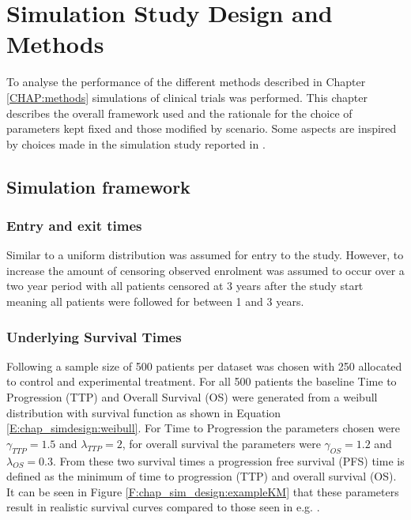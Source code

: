 \chapter{Simulation Study Design and Methods}
\label{C:chap_sim_design}


To analyse the performance of the different methods described in Chapter \ref{CHAP:methods} simulations of clinical trials was performed. This chapter describes the overall framework used and the rationale for the choice of parameters kept fixed and those modified by scenario. Some aspects are inspired by choices made in the simulation study reported in \cite{Morden2011}.

\section{Simulation framework}

\label{section:studydesign}

\subsection{Entry and exit times}
Similar to \cite{Morden2011} a uniform distribution was assumed for entry to the study. However, to increase the amount of censoring observed enrolment was assumed to occur over a two year period with all patients censored at 3 years after the study start meaning all patients were followed for between 1 and 3 years.

\subsection{Underlying Survival Times}
Following \cite{Morden2011} a sample size of 500 patients per dataset was chosen with 250 allocated to control and experimental treatment. For all 500 patients the baseline Time to Progression (TTP) and Overall Survival (OS) were generated from a weibull distribution with survival function as shown in Equation \ref{E:chap_simdesign:weibull}. For Time to Progression the parameters chosen were $\gamma_{TTP}=1.5$ and $\lambda_{TTP}=2$, for overall survival the parameters were $\gamma_{OS}=1.2$ and $\lambda_{OS}=0.3$. From these two survival times a progression free survival (PFS) time is defined as the minimum of time to progression (TTP) and overall survival (OS). It can be seen in Figure \ref{F:chap_sim_design:exampleKM} that these parameters result in realistic survival curves compared to those seen in e.g.  \cite{EMILIA}.

